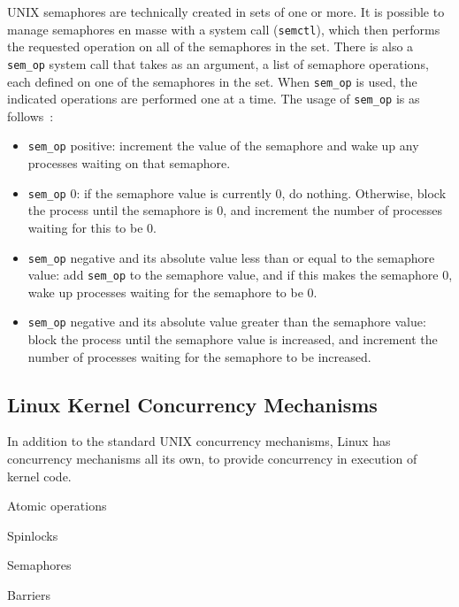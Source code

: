 UNIX semaphores are technically created in sets of one or more. It is possible to manage semaphores en masse with a system call (\texttt{semctl}), which then performs the requested operation on all of the semaphores in the set. There is also a \texttt{sem\_op} system call that takes as an argument, a list of semaphore operations, each defined on one of the semaphores in the set. When \texttt{sem\_op} is used, the indicated operations are performed one at a time. The usage of \texttt{sem\_op} is as follows~\cite{osi}:
\begin{itemize}
    \item \texttt{sem\_op} positive: increment the value of the semaphore and wake up any processes waiting on that semaphore.
    \item \texttt{sem\_op} 0: if the semaphore value is currently 0, do nothing. Otherwise, block the process until the semaphore is 0, and increment the number of processes waiting for this to be 0.
    \item \texttt{sem\_op} negative and its absolute value less than or equal to the semaphore value: add \texttt{sem\_op} to the semaphore value, and if this makes the semaphore 0, wake up processes waiting for the semaphore to be 0.
    \item \texttt{sem\_op} negative and its absolute value greater than the semaphore value: block the process until the semaphore value is increased, and increment the number of processes waiting for the semaphore to be increased.
\end{itemize}

\subsection*{Linux Kernel Concurrency Mechanisms}

In addition to the standard UNIX concurrency mechanisms, Linux has concurrency mechanisms all its own, to provide concurrency in execution of kernel code. 

Atomic operations

Spinlocks

Semaphores

Barriers





